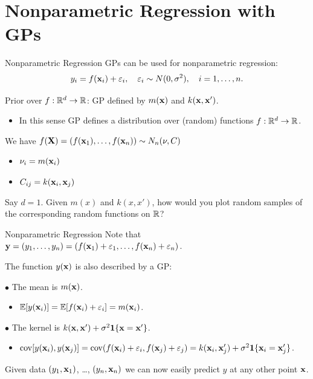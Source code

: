 \documentclass[11pt,handout,aspectratio=169]{beamer}
\begin{document}
\section{Nonparametric Regression with GPs}

\begin{frame}{Nonparametric Regression}
GPs can be used for nonparametric regression:
    \[
    y_i = f(\mathbf{x}_i) + \varepsilon_i, \quad \varepsilon_i \sim {N}(0, \sigma^2),\quad i=1,\ldots, n.
    \]
    
Prior over \( f:\mathbb R^d\to \mathbb R \): GP defined by \( m(\mathbf{x}) \) and \( k(\mathbf{x}, \mathbf{x}') \).
    \begin{itemize}
    \item In this sense GP defines a distribution over (random) functions $f: \mathbb R^d\to \mathbb R$.
    \end{itemize}    
    \medskip 
    
We have $f(\mathbf{X})=(f(\mathbf{x}_1),\ldots,f(\mathbf{x}_n))\sim N_n(\nu,C)$ 
    \begin{itemize}
    \item $\nu_i=m(\mathbf{x}_i)$
    \item $C_{ij}=k(\mathbf{x}_i,\mathbf{x}_j)$
    \end{itemize}
    
    \begin{alertblock}{}
    	Say $d=1$. Given \( m(x) \) and \( k(x, x') \), how would you plot random samples of the corresponding random functions on $\mathbb R$?
    \end{alertblock}

\end{frame}

\begin{frame}{Nonparametric Regression}
Note that $\mathbf{y}=(y_1,\ldots,y_n)=(f(\mathbf{x}_1)+\varepsilon_1,\ldots,f(\mathbf{x}_n)+\varepsilon_n)$.
\bigskip

The function $y(\mathbf{x})$ is also described by a GP:
\medskip 

$\bullet$ The mean is $m(\mathbf{x})$.
\begin{itemize}
	\item  $\mathbb E[y(\mathbf{x}_i)]=\mathbb E[f(\mathbf{x}_i)+\varepsilon_i]=m(\mathbf{x}_i)$.
\end{itemize}

$\bullet$  The kernel is $k(\mathbf{x},\mathbf{x}')+\sigma^2\boldsymbol 1\{\mathbf{x}=\mathbf{x}'\}$. 
\begin{itemize}
	\item  $\operatorname*{cov}[y(\mathbf{x}_i),y(\mathbf{x}_j)]=\operatorname*{cov}(f(\mathbf{x}_i)+\varepsilon_i,f(\mathbf{x}_j)+\varepsilon_j)=k(\mathbf{x}_i,\mathbf{x}'_j)+\sigma^2\boldsymbol 1\{\mathbf{x}_i=\mathbf{x}'_j\}$.
\end{itemize}

\begin{alertblock}{}
Given data $(y_1,\mathbf{x}_1)$, \ldots, $(y_n,\mathbf{x}_n)$ we can now easily predict $y$ at any other point $\mathbf{x}$.	
\end{alertblock}
\end{frame}
\end{document}
